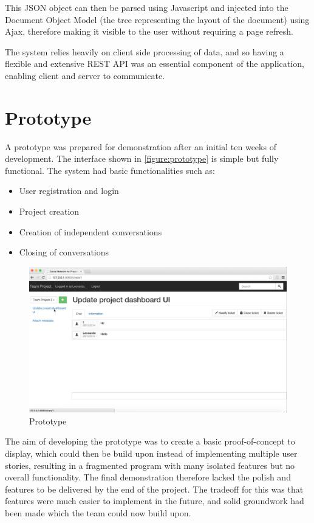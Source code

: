 \documentclass[a4paper]{l3proj}
\begin{document}
This JSON object can then be parsed using Javascript and injected into the Document Object Model (the tree representing the layout of the document) using Ajax, therefore making it visible to the user without requiring a page refresh.

The system relies heavily on client side processing of data, and so having a flexible and extensive REST API was an essential component of the application, enabling client and server to communicate.
\section{Prototype}
\label{prototype}


A prototype was prepared for demonstration after an initial ten weeks of development. The interface shown in \autoref{figure:prototype} is simple but fully functional. The system had basic functionalities such as: 

\begin{itemize}
\item User registration and login
\item Project creation
\item Creation of independent conversations
\item Closing of conversations
\end{itemize}

\begin{figure}[ht]
\centering
\includegraphics[scale=0.3]{prototype}
\caption{Prototype}
\label{figure:prototype}
\end{figure}

The aim of developing the prototype was to create a basic proof-of-concept to display, which could then be build upon instead of implementing multiple user stories, resulting in a fragmented program with many isolated features but no overall functionality.  The final demonstration therefore lacked the polish and features to be delivered by the end of the project. The tradeoff for this was that features were much easier to implement in the future, and solid groundwork had been made which the team could now build upon. 
\end{document}
